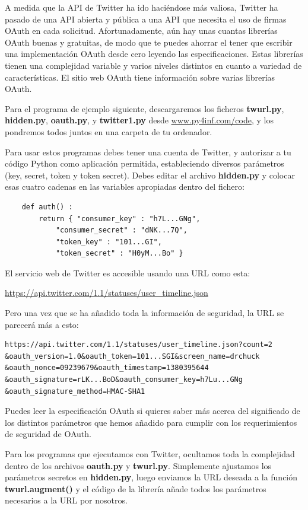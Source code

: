 A medida que la API de Twitter ha ido haciéndose más valiosa, Twitter
ha pasado de una API abierta y pública a una API que necesita
el uso de firmas OAuth en cada solicitud. Afortunadamente,
aún hay unas cuantas librerías OAuth buenas y gratuitas,
de modo que te puedes ahorrar el tener que escribir una implementación OAuth
desde cero leyendo las especificaciones. Estas librerías tienen
una complejidad variable y varios niveles distintos en cuanto a variedad de características.
El sitio web OAuth tiene información sobre varias librerías OAuth.

Para el programa de ejemplo siguiente, descargaremos los ficheros
{\bf twurl.py}, {\bf hidden.py}, 
{\bf oauth.py}, 
y
{\bf twitter1.py} desde
\url{www.py4inf.com/code}, y los pondremos todos juntos en una carpeta
de tu ordenador.

Para usar estos programas debes tener una cuenta de Twitter,
y autorizar a tu código Python como aplicación permitida,
estableciendo diversos parámetros (key, secret, token y token secret). Debes editar
el archivo {\bf hidden.py} y colocar esas cuatro cadenas en las
variables apropiadas dentro del fichero:

\beforeverb
\begin{verbatim}
    def auth() :
        return { "consumer_key" : "h7L...GNg",
            "consumer_secret" : "dNK...7Q",
            "token_key" : "101...GI",
            "token_secret" : "H0yM...Bo" }
\end{verbatim}
\afterverb
%
El servicio web de Twitter es accesible usando una URL como esta:

\url{https://api.twitter.com/1.1/statuses/user_timeline.json}

Pero una vez que se ha añadido toda la información de seguridad, la URL
se parecerá más a esto:

\beforeverb
\begin{verbatim}
https://api.twitter.com/1.1/statuses/user_timeline.json?count=2
&oauth_version=1.0&oauth_token=101...SGI&screen_name=drchuck
&oauth_nonce=09239679&oauth_timestamp=1380395644
&oauth_signature=rLK...BoD&oauth_consumer_key=h7Lu...GNg
&oauth_signature_method=HMAC-SHA1
\end{verbatim}
\afterverb
%
Puedes leer la especificación OAuth si quieres saber más
acerca del significado de los distintos parámetros que
hemos añadido para cumplir con los requerimientos de seguridad de OAuth.

Para los programas que ejecutamos con Twitter, ocultamos toda la
complejidad dentro de los archivos {\bf oauth.py} y {\bf twurl.py}.
Simplemente ajustamos los parámetros secretos en {\bf hidden.py}, luego
enviamos la URL deseada a la función {\bf twurl.augment()}
y el código de la librería añade todos los parámetros
necesarios a la URL por nosotros.

